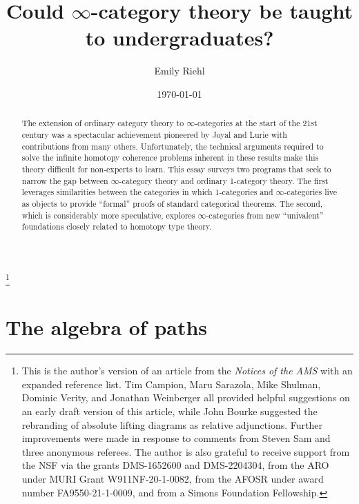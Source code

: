 \documentclass[11pt]{ctexart}
\theoremstyle{definition}
\theoremstyle{remark}
\numberwithin{equation}{section}
\newcommand{\1}{\mathbbe{1}}
\newcommand{\2}{\mathbbe{2}}
\newcommand{\3}{\mathbbe{3}}
\begin{document}
\title{Could \texorpdfstring{$\infty$}{infinity}-category theory be taught to undergraduates?}


    \author{Emily Riehl}
\date{\today} 


\thanks{This is the author's version of
an article from the \emph{Notices of the AMS} with an expanded reference list. Tim Campion, Maru Sarazola, Mike Shulman, Dominic Verity, and Jonathan Weinberger all provided helpful suggestions on an early draft version of this article, while John Bourke suggested the rebranding of absolute lifting diagrams as relative adjunctions. Further improvements were made in response to comments from Steven Sam and three anonymous referees. The author is also grateful to receive support from the NSF via the grants DMS-1652600 and DMS-2204304, from the ARO under MURI Grant W911NF-20-1-0082, from the AFOSR under award number FA9550-21-1-0009, and from a Simons Foundation Fellowship.}



\begin{abstract}
    The extension of ordinary category theory to $\infty$-categories at the start of the 21st century was a spectacular achievement pioneered by Joyal and Lurie with contributions from many others. Unfortunately, the technical arguments required to solve the infinite homotopy coherence problems inherent in these results make this theory difficult for non-experts to learn. This essay surveys two programs that seek to narrow the gap between $\infty$-category theory and ordinary 1-category theory. The first leverages similarities between the categories in which 1-categories and $\infty$-categories live as objects to provide ``formal'' proofs of standard categorical theorems. The second, which is considerably more speculative, explores $\infty$-categories from new ``univalent'' foundations closely related to homotopy type theory.
\end{abstract}

\maketitle

\setcounter{tocdepth}{1}
\tableofcontents

\section{The algebra of paths}
\end{document}
